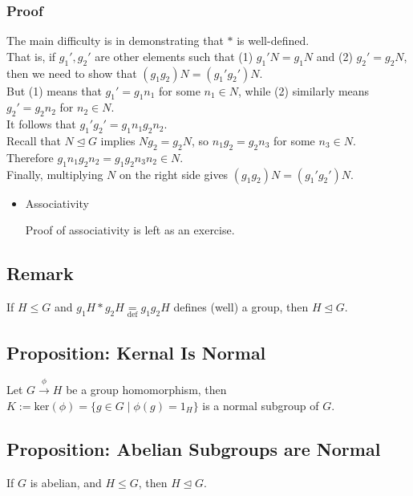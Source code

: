 \documentclass[11pt]{article}
\newcommand{\0}{\emptyset}
\begin{document}
\subsubsection*{Proof}
\label{sec:orgb7b38b6}
The main difficulty is in demonstrating that \(*\) is well-defined.\\[0pt]
That is, if \(g_{1}',g_{2}'\) are other elements such that (1) \(g_{1}'N=g_{1}N\) and (2) \(g_{2}'=g_{2}N\), then we need to show that \((g_{1}g_{2})N=(g_{1}'g_{2}')N\).\\[0pt]
But (1) means that \(g_{1}'=g_{1}n_{1}\) for some \(n_{1}\in N\), while (2) similarly means \(g_{2}'=g_{2}n_{2}\) for \(n_{2}\in N\).\\[0pt]
It follows that \(g_{1}'g_{2}'=g_{1}n_{1}g_{2}n_{2}\).\\[0pt]
Recall that \(N\trianglelefteq G\) implies \(Ng_{2}=g_{2}N\), so \(n_{1}g_{2}=g_{2}n_{3}\) for some \(n_{3}\in N\).\\[0pt]
Therefore \(g_{1}n_{1}g_{2}n_{2}=g_{1}g_{2}n_{3}n_{2}\in N\).\\[0pt]
Finally, multiplying \(N\) on the right side gives \((g_{1}g_{2})N=(g_{1}'g_{2}')N\).\\[0pt]
\begin{itemize}
\item Associativity
\label{sec:org9c69a68}

Proof of associativity is left as an exercise.\\[0pt]
\end{itemize}
\subsection*{Remark}
\label{sec:orgd69aff6}
If \(H\leq G\) and \(g_{1}H*g_{2}H\underset{\text{def}}=g_{1}g_{2}H\) defines (well) a group, then \(H\trianglelefteq G\).\\[0pt]
\subsection*{Proposition: Kernal Is Normal}
\label{sec:org5f9a885}
Let \(G\overset{\phi}{\to}H\) be a group homomorphism, then \(K:=\text{ker}(\phi)=\{g\in G\;|\;\phi(g)=1_{H}\}\) is a normal subgroup of \(G\).\\[0pt]
\subsection*{Proposition: Abelian Subgroups are Normal}
\label{sec:orgeeabeec}
If \(G\) is abelian, and \(H\leq G\), then \(H\trianglelefteq G\).\\[0pt]
\end{document}
